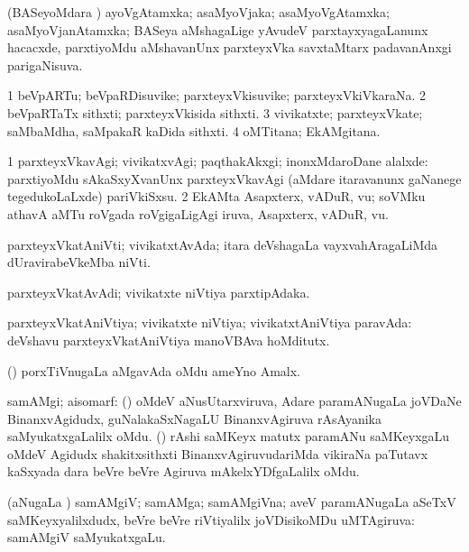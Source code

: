 \bentry
{}
\gl{\gu}
\bmng
(BASeyoMdara \vi) ayoVgAtamxka; asaMyoVjaka; asaMyoVgAtamxka; asaMyoVjanAtamxka; BASeya aMshagaLige yAvudeV parxtayxyagaLanunx hacacxde, parxtiyoMdu aMshavanUnx parxteyxVka savxtaMtarx padavanAnxgi parigaNisuva. 
\emng
\eentry

\bentry
{}
\gl{\nA}
\bmng
\bnum
\num{1} beVpARTu; beVpaRDisuvike; parxteyxVkisuvike; parxteyxVkiVkaraNa. 
\num{2} beVpaRTaTx sithxti; parxteyxVkisida sithxti. 
\num{3} vivikatxte; parxteyxVkate; saMbaMdha, saMpakaR kaDida sithxti. 
\num{4} oMTitana; EkAMgitana. 
\enum
\emng

\noindent
\gl{\pagu}
\bmng
\bnum
\num{1}  parxteyxVkavAgi; vivikatxvAgi; paqthakAkxgi; inonxMdaroDane alalxde:  parxtiyoMdu sAkaSxyXvanUnx parxteyxVkavAgi (aMdare itaravanunx gaNanege tegedukoLaLxde) pariVkiSxsu. 
\num{2}  EkAMta Asapxterx, vADuR, \mo vu; soVMku athavA aMTu roVgada roVgigaLigAgi iruva, Asapxterx, vADuR, \mo vu. 
\enum
\emng
\eentry

\bentry
{}
\gl{\nA}
\bmng
parxteyxVkatAniVti; vivikatxtAvAda; itara deVshagaLa vayxvahAragaLiMda dUravirabeVkeMba niVti. 
\emng
\eentry

\bentry
{}
\gl{\nA}
\bmng
parxteyxVkatAvAdi; vivikatxte niVtiya parxtipAdaka. 
\emng
\eentry

\bentry
{}
\gl{\gu}
\bmng
parxteyxVkatAniVtiya; vivikatxte niVtiya; vivikatxtAniVtiya paravAda:  deVshavu parxteyxVkatAniVtiya manoVBAva hoMditutx. 
\emng
\eentry

\bentry
{}
\gl{\nA}
\bmng
(\jiVra) porxTiVnugaLa aMgavAda oMdu ameYno Amalx. 
\emng
\eentry

\bentry
{}
\gl{\nA}
\bmng
samAMgi; aisomarf: 
\banum
{} (\ravi) oMdeV aNusUtarxviruva, Adare paramANugaLa joVDaNe BinanxvAgidudx, guNalakaSxNagaLU BinanxvAgiruva rAsAyanika saMyukatxgaLalilx oMdu. 
 (\Bwvi) rAshi saMKeyx matutx paramANu saMKeyxgaLu oMdeV Agidudx shakitxsithxti BinanxvAgiruvudariMda vikiraNa paTutavx kaSxyada dara beVre beVre Agiruva mAkelxYDfgaLalilx oMdu. 
\eanum
\emng
\eentry

\bentry
{}
\gl{\gu}
\bmng
(aNugaLa \vi) samAMgiV; samAMga; samAMgiVna; aveV paramANugaLa aSeTxV saMKeyxyalilxdudx, beVre beVre riVtiyalilx joVDisikoMDu uMTAgiruva:  samAMgiV saMyukatxgaLu. 
\emng
\eentry

